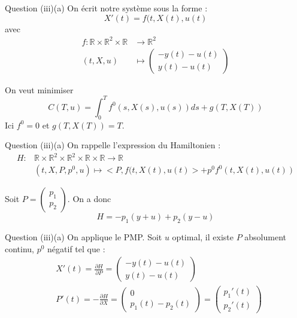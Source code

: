 \documentclass[11pt]{beamer}
\begin{document}
\begin{frame}{Question (iii)(a)}
On écrit notre système sous la forme :
\begin{equation}
X'(t) = f(t,X(t),u(t)
\end{equation}
avec 
\begin{align*}
f : \mathbb{R}\times\mathbb{R}^2\times\mathbb{R} &\longrightarrow \mathbb{R}^2 \\
(t,X,u) &\longmapsto \begin{pmatrix} -y(t)-u(t) \\ y(t)-u(t) \end{pmatrix}
\end{align*}

On veut minimiser 
\begin{equation}
C(T,u)=\int_0^T f^0(s,X(s),u(s))ds + g(T,X(T))
\end{equation}
Ici $f^0 = 0$ et $g(T,X(T))=T$.
\end{frame}

\begin{frame}{Question (iii)(a)}
On rappelle l'expression du Hamiltonien : 
\begin{align*}
H : &\mathbb{R}\times\mathbb{R}^2\times\mathbb{R}^2\times\mathbb{R}\times\mathbb{R}  \longrightarrow \mathbb{R} \\
&(t,X,P,p^0,u) \longmapsto <P,f(t,X(t),u(t)> + p^0 f^0(t,X(t),u(t))
\end{align*}

Soit $P = \begin{pmatrix} p_1 \\ p_2 \end{pmatrix}$. On a donc 
\begin{equation}
H = -p_1(y+u) + p_2(y-u)
\end{equation}
\end{frame}

\begin{frame}{Question (iii)(a)}
On applique le PMP. Soit $u$ optimal, il existe $P$ absolument continu, $p^0$ négatif tel que :
\begin{align}
&X'(t) = \frac{\partial H}{\partial P} = \begin{pmatrix} -y(t)-u(t) \\ y(t)-u(t) \end{pmatrix} \\
&P'(t) = - \frac{\partial H}{\partial X} = \begin{pmatrix} 0 \\ p_1(t)-p_2(t) \end{pmatrix} = \begin{pmatrix} p_1'(t) \\ p_2'(t) \end{pmatrix}
\end{align}
\end{frame}
\end{document}
